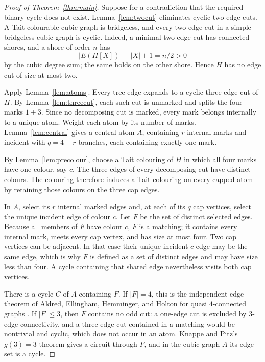 \documentclass[11pt]{article}
\theoremstyle{definition}
\theoremstyle{remark}
\begin{document}
\begin{proof}[Proof of Theorem~\ref{thm:main}]
Suppose for a contradiction that the required binary cycle does not
exist.  Lemma~\ref{lem:twocut} eliminates cyclic two-edge cuts.  A
Tait-colourable cubic graph is bridgeless, and every two-edge cut in a
simple bridgeless cubic graph is cyclic.  Indeed, a minimal two-edge cut
has connected shores, and a shore of order \(n\) has
\[
 |E(H[X])|-|X|+1=n/2>0
\]
by the cubic degree sum; the same holds on the other shore.  Hence
\(H\) has no edge cut of size at most two.

Apply Lemma~\ref{lem:atoms}.  Every tree edge expands to a cyclic
three-edge cut of \(H\).  By Lemma~\ref{lem:threecut}, each such cut is
unmarked and splits the four marks \(1+3\).  Since no decomposing cut is
marked, every mark belongs internally to a unique atom.  Weight each
atom by its number of marks.  Lemma~\ref{lem:central} gives a central
atom \(A\), containing \(r\) internal marks and incident with
\(q=4-r\) branches, each containing exactly one mark.

By Lemma~\ref{lem:precolour}, choose a Tait colouring of \(H\) in which
all four marks have one colour, say \(c\).  The three edges of every
decomposing cut have distinct colours.  The colouring therefore induces
a Tait colouring on every capped atom by retaining those colours on the
three cap edges.

In \(A\), select its \(r\) internal marked edges and, at each of its
\(q\) cap vertices, select the unique incident edge of colour \(c\).
Let \(F\) be the set of distinct selected edges.  Because all members of
\(F\) have colour \(c\), \(F\) is a matching; it contains every internal
mark, meets every cap vertex, and has size at most four.
Two cap vertices can be adjacent.  In that case their unique incident
\(c\)-edge may be the same edge, which is why \(F\) is defined as a set
of distinct edges and may have size less than four.  A cycle containing
that shared edge nevertheless visits both cap vertices.

There is a cycle \(C\) of \(A\) containing \(F\).  If \(|F|=4\), this
is the independent-edge theorem of Aldred, Ellingham, Hemminger, and
Holton for quasi \(4\)-connected graphs
\cite[Theorem~3.3]{aldred1997}.  If
\(|F|\le3\), then \(F\) contains no odd cut: a one-edge cut is excluded
by \(3\)-edge-connectivity, and a three-edge cut contained in a
matching would be nontrivial and cyclic, which does not occur in an
atom.  Knappe and Pitz's \(g(3)=3\) theorem
\cite[Fact~5.4]{knappe2020} gives a circuit through \(F\), and in
the cubic graph \(A\) its edge set is a cycle.


\end{proof}
\end{document}
